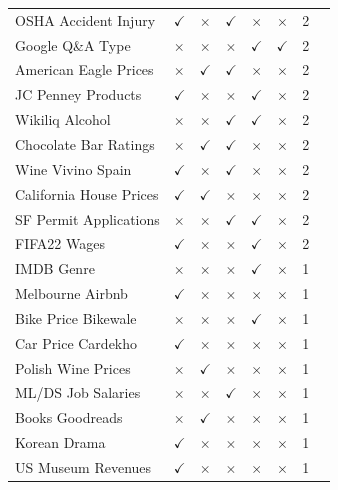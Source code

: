 \documentclass{llmxive}
\begin{document}
\begin{longtable}{llcccccr}
OSHA Accident Injury   & $\checkmark$ & $\times$     & $\checkmark$ & $\times$     & $\times$     & 2 \\
Google Q\&A Type   & $\times$     & $\times$     & $\times$     & $\checkmark$ & $\checkmark$ & 2 \\
American Eagle Prices     & $\times$     & $\checkmark$ & $\checkmark$ & $\times$     & $\times$     & 2 \\
JC Penney Products   & $\checkmark$ & $\times$     & $\times$     & $\checkmark$ & $\times$     & 2 \\
Wikiliq Alcohol   & $\times$     & $\times$     & $\checkmark$ & $\checkmark$ & $\times$     & 2 \\
Chocolate Bar Ratings   & $\times$     & $\checkmark$ & $\checkmark$ & $\times$     & $\times$     & 2 \\
Wine Vivino Spain   & $\checkmark$ & $\times$     & $\checkmark$ & $\times$     & $\times$     & 2 \\
California House Prices  & $\checkmark$ & $\checkmark$ & $\times$     & $\times$     & $\times$     & 2 \\
SF Permit Applications   & $\times$     & $\times$     & $\checkmark$ & $\checkmark$ & $\times$     & 2 \\
FIFA22 Wages  & $\checkmark$ & $\times$     & $\times$     & $\checkmark$ & $\times$     & 2 \\
IMDB Genre  & $\times$     & $\times$     & $\times$     & $\checkmark$ & $\times$     & 1 \\
Melbourne Airbnb   & $\checkmark$ & $\times$     & $\times$     & $\times$     & $\times$     & 1 \\
Bike Price Bikewale   & $\times$     & $\times$     & $\times$     & $\checkmark$ & $\times$     & 1 \\
Car Price Cardekho   & $\checkmark$ & $\times$     & $\times$     & $\times$     & $\times$     & 1 \\
Polish Wine Prices  & $\times$     & $\checkmark$ & $\times$     & $\times$     & $\times$     & 1 \\
ML/DS Job Salaries  & $\times$     & $\times$     & $\checkmark$ & $\times$     & $\times$     & 1 \\
Books Goodreads    & $\times$     & $\checkmark$ & $\times$     & $\times$     & $\times$     & 1 \\
Korean Drama     & $\checkmark$ & $\times$     & $\times$     & $\times$     & $\times$     & 1 \\
US Museum Revenues   & $\checkmark$ & $\times$     & $\times$     & $\times$     & $\times$     & 1 \\

\end{longtable}
\end{document}

